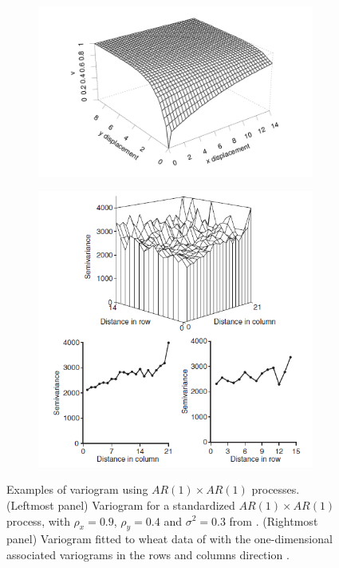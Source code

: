 \begin{figure}[hbtp]
	\centering
	\begin{subfigure}[t]{0.45\textwidth}
		\centering
		\includegraphics[width = \textwidth]{figures/Variogram-for-a-standardised-AR1AR1-process.png}
	\end{subfigure}
	\begin{subfigure}[t]{0.45\textwidth}
		\centering
		\includegraphics[width = \textwidth]{figures/AR1AR1-process-variogram-fit.PNG}
	\end{subfigure}
	\caption[Examples of variograms using $AR(1) \times AR(1)$ processes]{Examples of variogram using $AR(1) \times AR(1)$ processes.(Leftmost panel) Variogram for a standardized $AR(1) \times AR(1)$ process, with $\rho_{x} = 0.9$, $\rho_{y} = 0.4$ and $\sigma^2=0.3$ from \textcite{gilmour_accounting_1997}. (Rightmost panel) Variogram fitted to wheat data of \textcite{gilmour_accounting_1997} with the one-dimensional associated variograms in the rows and columns direction \parencite{piepho_linear_2010}. }
	\label{fig:variogram_example}
\end{figure}


